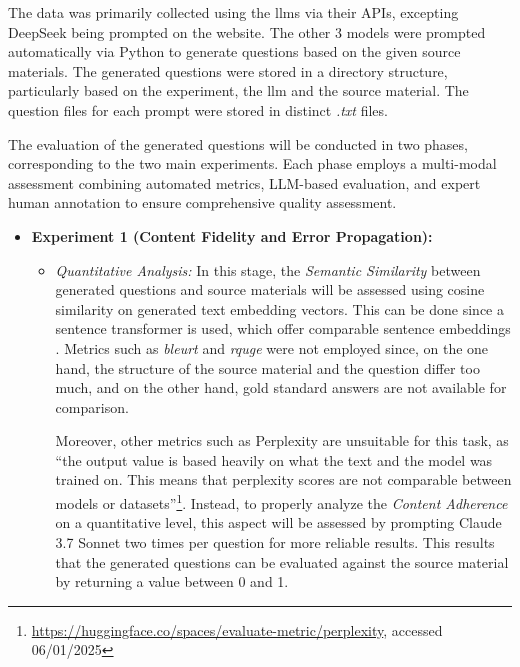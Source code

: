  The data was primarily collected using the \ac{llms} via their APIs, excepting DeepSeek being prompted on the website. The other 3 models were prompted automatically via Python to generate questions based on the given source materials. The generated questions were stored in a directory structure, particularly based on the experiment, the \ac{llm} and the source material. The question files for each prompt were stored in distinct \textit{.txt} files.

 The evaluation of the generated questions will be conducted in two phases, corresponding to the two main experiments. Each phase employs a multi-modal assessment combining automated metrics, LLM-based evaluation, and expert human annotation to ensure comprehensive quality assessment.
\begin{itemize}
    \item \textbf{Experiment 1 (Content Fidelity and Error Propagation):}
    \begin{itemize}
        \item \textit{Quantitative Analysis:} In this stage, the \textit{Semantic Similarity} between generated questions and source materials will be assessed using cosine similarity on generated text embedding vectors. This can be done since a sentence transformer is used, which offer comparable sentence embeddings \cite{reimers_sentence-bert_2019}. Metrics such as \textit{\ac{bleurt}} and \textit{\ac{rquge}} were not employed since, on the one hand, the structure of the source material and the question differ too much, and on the other hand, gold standard answers are not available for comparison.

        \pagebreak
        
               
        Moreover, other metrics such as Perplexity are unsuitable for this task, as \enquote{the output value is based heavily on what the text and the model was trained on. This means that perplexity scores are not comparable between models or datasets}\footnote{\url{https://huggingface.co/spaces/evaluate-metric/perplexity}, accessed 06/01/2025}. Instead, to properly analyze the \textit{Content Adherence} on a quantitative level, this aspect will be assessed by prompting Claude 3.7 Sonnet two times per question for more reliable results. This results that the generated questions can be evaluated against the source material by returning a value between 0 and 1.



\end{itemize}
\end{itemize}
